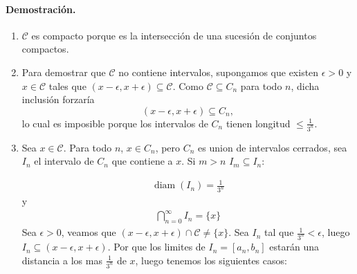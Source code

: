 \paragraph{\textbf{Demostración.}}
\begin{enumerate}
  \item $\mathcal C$ es compacto porque es la intersección de una sucesión de conjuntos compactos.
  \item Para demostrar que $\mathcal C$ no contiene intervalos, supongamos que existen $\epsilon>0$ y $x\in\mathcal C$ tales que $(x-\epsilon,x+\epsilon)\subseteq\mathcal C$.  
  Como $\mathcal C\subseteq C_n$ para todo $n$, dicha inclusión forzaría
  \[
  (x-\epsilon,x+\epsilon)\subseteq C_n,
  \]
  lo cual es imposible porque los intervalos de $C_n$ tienen longitud $\le\frac{1}{3^{n}}$.
  \item
   Sea $x\in\mathcal C$. Para todo $n$, $x\in C_n$, pero $C_n$ es union de intervalos cerrados, sea  $I_n$ el intervalo de $C_n$ que contiene a $x$. Si $m>n$ $I_m\subseteq I_n$:


\begin{align*}
\operatorname{diam}(I_n) = \frac{1}{3^n} 
\end{align*}
y
\begin{align*}
\bigcap_{n=0}^{\infty} I_n = \{x\}
\end{align*}
Sea $\epsilon > 0$, veamos que $(x-\epsilon, x+\epsilon) \cap \mathcal C \neq \{x\}$.  Sea $I_n$ tal que $\frac{1}{3^n} < \epsilon$, luego $I_n \subseteq (x-\epsilon, x+\epsilon)$. Por que los limites de $I_n = [a_n,b_n]$ estarán una distancia a los mas $\frac{1}{3^n}$ de $x$, luego tenemos los siguientes casos:
\begin{center}
\end{center}
\end{enumerate}
